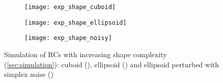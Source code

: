 \begin{figure}
  \centering
  \captionsetup[subfigure]{aboveskip=3pt, belowskip=5pt}

  \begin{subfigure}{0.26\textwidth}
    \texttt{[image: exp\_shape\_cuboid]}
    \caption{\label{fig:exp_shape_cuboid}}
  \end{subfigure}
  \hfill
  \begin{subfigure}{0.26\textwidth}
    \texttt{[image: exp\_shape\_ellipsoid]}
    \caption{\label{fig:exp_shape_ellipsoid}}
  \end{subfigure}
  \hfill
  \begin{subfigure}{0.26\textwidth}
    \texttt{[image: exp\_shape\_noisy]}
    \caption{\label{fig:exp_shape_noisy}}
  \end{subfigure}

  \caption{
    Simulation of \acp{RC} with increasing shape complexity (\cref{sec:simulation}):
    cuboid (),
    ellipsoid ()
    and ellipsoid perturbed with simplex noise ()
  }
  \label{fig:exp_shape}
\end{figure}
